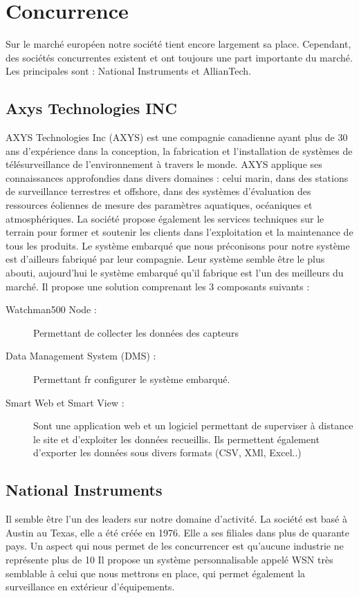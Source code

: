 \section{Concurrence}

Sur le marché européen notre société tient encore largement sa place. Cependant, des sociétés concurrentes existent et ont toujours une part importante du marché. Les principales sont : National Instruments et AllianTech.

        \subsection{Axys Technologies INC}
        AXYS Technologies Inc (AXYS) est une compagnie canadienne ayant plus de 30 ans d'expérience dans la conception, la fabrication et l'installation de systèmes de télésurveillance de l'environnement à travers le monde. AXYS applique ses connaissances approfondies dans divers domaines : celui marin, dans des stations de surveillance terrestres et offshore, dans des systèmes d'évaluation des ressources éoliennes de mesure des paramètres aquatiques, océaniques et atmosphériques. La société propose également les services techniques sur le terrain pour former et soutenir les clients dans l'exploitation et la maintenance de tous les produits. Le système embarqué que nous préconisons pour notre système est d'ailleurs fabriqué par leur compagnie. Leur système semble être le plus abouti, aujourd'hui le système embarqué qu'il fabrique est l'un des meilleurs du marché. Il propose une solution comprenant les 3 composants suivants :
\begin{description}
           \item[Watchman500 Node :] Permettant de collecter les données des capteurs
           \item[Data Management System (DMS) :] Permettant fr configurer le système embarqué.
           \item[Smart Web et Smart View :] Sont une application web et un logiciel permettant de superviser à distance le site et d'exploiter les données recueillis. Ils permettent également d'exporter les données sous divers formats (CSV, XMl, Excel..)
\end{description}

        \subsection{National Instruments}
        Il semble être l'un des leaders sur notre domaine d'activité. La société est basé à Austin au Texas, elle a été créée en 1976. Elle a ses filiales dans plus de quarante pays. Un aspect qui nous permet de les concurrencer est qu'aucune industrie ne représente plus de 10%
        Il propose un système personnalisable appelé WSN très semblable à celui que nous mettrons en place, qui permet également la surveillance en extérieur d'équipements.

